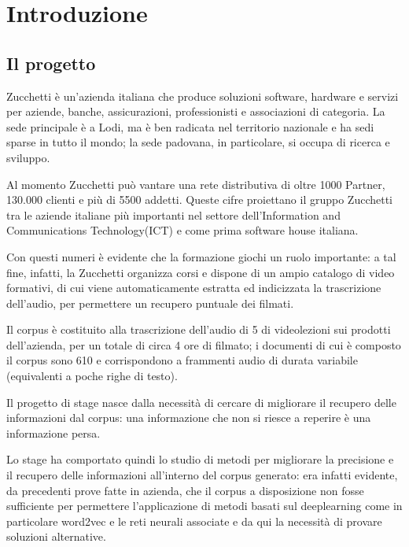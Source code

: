 
\chapter{Introduzione}
\label{cap:introduzione}
\section{Il progetto}
\label{sec:progetto}
Zucchetti è un’azienda italiana che produce soluzioni software, hardware e servizi
per aziende, banche, assicurazioni, professionisti e associazioni di categoria. 
La sede principale è a Lodi, ma è ben radicata nel territorio nazionale e ha sedi sparse in tutto il mondo;
la sede padovana, in particolare, si occupa di ricerca e sviluppo.

Al momento Zucchetti può vantare una rete distributiva di oltre 1000 Partner, 130.000
clienti e più di 5500 addetti. Queste cifre proiettano il gruppo Zucchetti tra le aziende italiane 
più importanti nel settore dell’Information and Communications Technology(ICT) e come prima
software house italiana.

Con questi numeri è evidente che la formazione giochi un ruolo importante: a tal fine, infatti, la 
Zucchetti organizza corsi e dispone di un ampio catalogo di video formativi, di cui viene automaticamente 
estratta ed indicizzata la trascrizione dell’audio, per permettere un recupero puntuale dei filmati.

Il \gls{corpus}\glsfirstoccur{} è costituito alla trascrizione dell’audio di 5 di videolezioni sui prodotti dell'azienda, per un totale di circa 4 ore di filmato; i documenti di cui è composto il
\gls{corpus} sono 610 e corrispondono a frammenti audio di durata variabile (equivalenti a
poche righe di testo).

Il progetto di stage nasce dalla necessità di cercare di migliorare il recupero delle informazioni 
dal \gls{corpus}: una informazione che non si riesce a reperire è una informazione persa.

Lo stage ha comportato quindi lo studio di metodi per migliorare la precisione e il recupero delle informazioni
all’interno del \gls{corpus} generato: era infatti evidente, da precedenti prove fatte in azienda, che il \gls{corpus}
a disposizione non fosse sufficiente per permettere l’applicazione di 
metodi basati sul deeplearning come in particolare word2vec e le reti neurali associate e da qui la necessità di provare soluzioni alternative.

